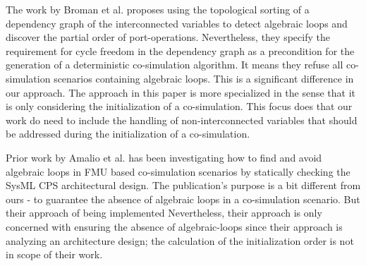 \documentclass[runningheads]{llncs}
\begin{document}
The work by Broman et al. \cite{BromanCompositionCo-Simulation} proposes using the topological sorting of a dependency graph of the interconnected variables to detect algebraic loops and discover the partial order of port-operations. Nevertheless, they specify the requirement for cycle freedom in the dependency graph as a precondition for the generation of a deterministic co-simulation algorithm. It means they refuse all co-simulation scenarios containing algebraic loops. This is a significant difference in our approach. The approach in this paper is more specialized in the sense that it is only considering the initialization of a co-simulation. This focus does that our work do need to include the handling of non-interconnected variables that should be addressed during the initialization of a co-simulation. 

Prior work by Amalio et al. \cite{Amalio2016CheckingCo-simulation} has been investigating how to find and avoid algebraic loops in FMU based co-simulation scenarios by statically checking the SysML CPS architectural design. The publication's purpose is a bit different from ours - to guarantee the absence of algebraic loops in a co-simulation scenario. But their approach of being implemented 
Nevertheless, their approach is only concerned with ensuring the absence of algebraic-loops since their approach is analyzing an architecture design; the calculation of the initialization order is not in scope of their work.




%



\end{document}
